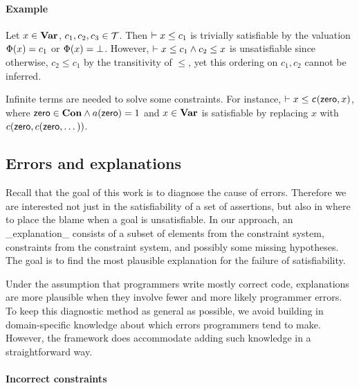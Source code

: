 \paragraph{Example}

Let $x\in \mathbf{Var}$, $c_1, c_2, c_3\in \mathcal{T}$. Then $\vdash x \leq c_1$ is
trivially satisfiable by the valuation $\Phi(x)=c_1$ or
$\Phi(x)=\bot$. However, $\vdash x \leq c_1 \land c_2 \leq x$ is
unsatisfiable since otherwise, $c_2 \leq c_1$ by the transitivity of
$\leq$, yet this ordering on $c_1, c_2$ cannot be inferred.

Infinite terms are needed to solve some constraints. For instance,
$\vdash x \leq \textsf{\textit{c}}(\textsf{zero}, x)$, where $\textsf{zero}
\in \mathbf{Con} \land a(\textsf{zero})=1$ and $x\in \mathbf{Var}$ is satisfiable
by replacing $x$ with $c(\textsf{zero}, c(\textsf{zero}, \dots))$.


\subsection{Errors and explanations}

Recall that the goal of this work is to diagnose the cause of errors.
Therefore we are interested not just in the satisfiability of a
set of assertions, but also in where to place the blame when
a goal is unsatisfiable. In our approach,
an _explanation_ consists of a subset of elements from the constraint
system, constraints from the constraint system, and possibly some
missing hypotheses. The goal is to find the most plausible
explanation for the failure of satisfiability. 

Under the assumption that programmers write mostly correct code,
explanations are more plausible when they involve fewer and more
likely programmer errors. To keep this diagnostic method as general as
possible, we avoid building in domain-specific knowledge about which
errors programmers tend to make. However, the framework does
accommodate adding such knowledge in a straightforward way.


\paragraph{Incorrect constraints}

